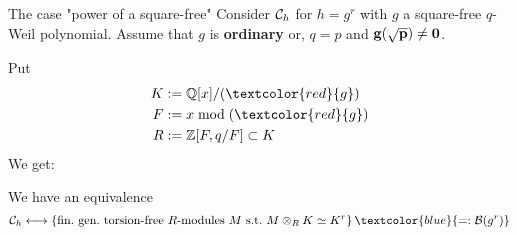 \documentclass[usenames,dvipsnames]{beamer}
\newcommand{\red}[1]{\textcolor{red}{#1}}
\newcommand{\blue}[1]{\textcolor{blue}{#1}}
\begin{document}
% 
%     

\begin{frame}{ The case "power of a square-free"  }
    Consider ${\mathcal C}_h$ for $h=g^r$ with $g$ a square-free $q$-Weil polynomial. 
    Assume that $g$ is \textbf{ordinary} or, $q=p$ and $\bf{g(\sqrt{p})\neq 0}$.

    \pause Put
    \begin{align*}
    K &:= \Q[x]/(\red{g})\\
    F &:= x \mod (\red{g})\\
    R &:= \Z[F,q/F] \subset K
    \end{align*}
    \pause We get:
    \begin{theorem}[M.]
    We have an equivalence
    \[ \cC_h \longleftrightarrow \set{ \text{fin.~gen.~torsion-free $R$-modules $M$ s.t.~$M\otimes_R K\simeq K^r$} }\blue{=:\cB(g^r)} \]
    \end{theorem}
\end{frame}
\end{document}
